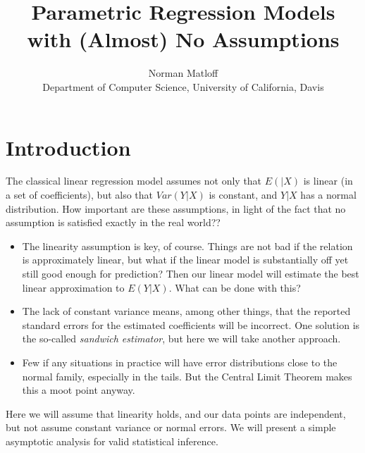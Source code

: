 \documentclass{article}
\begin{document}
\title{Parametric Regression Models with (Almost) No Assumptions}
\author{Norman Matloff \\
  Department of Computer Science, University of California, Davis
}

\maketitle

\section{Introduction}

The classical linear regression model assumes not only that $E(|X)$ is
linear (in a set of coefficients), but also that $Var(Y|X)$ is constant,
and $Y|X$ has a normal distribution.  How important are these
assumptions, in light of the fact that no assumption is satisfied
exactly in the real world??

\begin{itemize}

\item The linearity assumption is key, of course.  Things are not bad if
the relation is approximately linear, but what if the linear model is
substantially off yet still good enough for prediction?  Then our linear
model will estimate the best linear approximation to $E(Y|X)$.  What can
be done with this?

\item The lack of constant variance means, among other things, that the
reported standard errors for the estimated coefficients will be
incorrect.  One solution is the so-called \textit{sandwich estimator},
but here we will take another approach.

\item Few if any situations in practice will have error distributions
close to the normal family, especially in the tails.  But the Central
Limit Theorem makes this a moot point anyway.

\end{itemize} 

Here we will assume that linearity holds, and our data points are
independent, but not assume constant variance or normal errors.  We will
present a simple asymptotic analysis for valid statistical inference.
\end{document}

